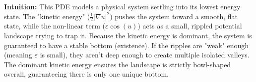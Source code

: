 \begin{solution}
\textbf{Intuition:}
This PDE models a physical system settling into its lowest energy state. The "kinetic energy" ($\frac{1}{2}|\nabla u|^2$) pushes the system toward a smooth, flat state, while the non-linear term ($\varepsilon\cos(u)$) acts as a small, rippled potential landscape trying to trap it. Because the kinetic energy is dominant, the system is guaranteed to have a stable bottom (existence). If the ripples are "weak" enough (meaning $\varepsilon$ is small), they aren't deep enough to create multiple isolated valleys. The dominant kinetic energy ensures the landscape is strictly bowl-shaped overall, guaranteeing there is only one unique bottom.
\end{solution}
